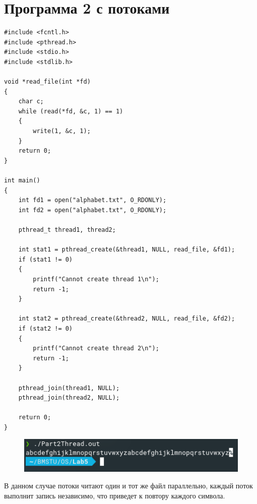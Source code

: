 \documentclass[14pt, a4paper]{extarticle}
\begin{document}
\section*{Программа 2 с потоками}
\begin{lstlisting}
#include <fcntl.h>
#include <pthread.h>
#include <stdio.h>
#include <stdlib.h>

void *read_file(int *fd)
{
	char c;
	while (read(*fd, &c, 1) == 1)
	{
		write(1, &c, 1);
	}
	return 0;
}

int main()
{    
	int fd1 = open("alphabet.txt", O_RDONLY);
	int fd2 = open("alphabet.txt", O_RDONLY);
	
	pthread_t thread1, thread2;
	
	int stat1 = pthread_create(&thread1, NULL, read_file, &fd1);
	if (stat1 != 0)
	{
		printf("Cannot create thread 1\n");
		return -1;
	}
	
	int stat2 = pthread_create(&thread2, NULL, read_file, &fd2);
	if (stat2 != 0)
	{
		printf("Cannot create thread 2\n");
		return -1;
	}
	
	pthread_join(thread1, NULL);
	pthread_join(thread2, NULL);
	
	return 0;
}
\end{lstlisting}
\begin{figure}[h!]
	\includegraphics[scale=1]{source/Part2Thread.png}
\end{figure}
В данном случае потоки читают один и тот же файл параллельно, каждый поток выполнит запись независимо, что приведет к повтору каждого символа.
\newpage
\end{document}
